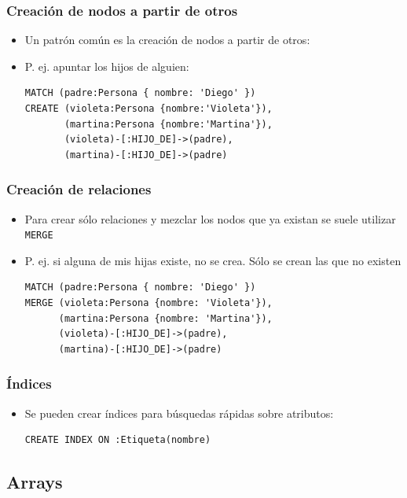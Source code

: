 \documentclass[14pt]{beamer}
\begin{document}
\begin{frame}[fragile]
  \frametitle{Creación de nodos a partir de otros}
  \begin{itemize}
  \item Un patrón común es la creación de nodos a partir de otros:
\item P. ej. apuntar los hijos de alguien:
\begin{lstlisting}[language=cypher]
MATCH (padre:Persona { nombre: 'Diego' })
CREATE (violeta:Persona {nombre:'Violeta'}),
       (martina:Persona {nombre:'Martina'}),
       (violeta)-[:HIJO_DE]->(padre),
       (martina)-[:HIJO_DE]->(padre)
\end{lstlisting}
  \end{itemize}
\end{frame}

\begin{frame}[fragile]
  \frametitle{Creación de relaciones}
  \begin{itemize}
  \item Para crear sólo relaciones y mezclar los nodos que ya existan se
    suele utilizar {\tt MERGE}
\item P. ej. si alguna de mis hijas existe, no se crea. Sólo se crean las
  que no existen
\begin{lstlisting}[language=cypher]
MATCH (padre:Persona { nombre: 'Diego' })
MERGE (violeta:Persona {nombre: 'Violeta'}),
      (martina:Persona {nombre: 'Martina'}),
      (violeta)-[:HIJO_DE]->(padre),
      (martina)-[:HIJO_DE]->(padre)
\end{lstlisting}
  \end{itemize}
\end{frame}


\begin{frame}[fragile]
  \frametitle{Índices}
  \begin{itemize}
  \item Se pueden crear índices para búsquedas rápidas sobre atributos:
\begin{lstlisting}[language=cypher]
CREATE INDEX ON :Etiqueta(nombre)
\end{lstlisting}
  \end{itemize}
\end{frame}



\subsection{Arrays}
\end{document}
